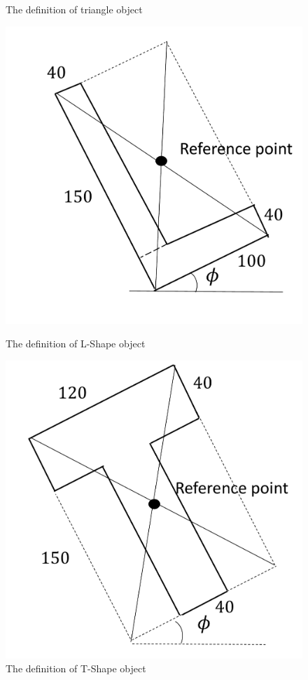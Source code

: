 \documentclass[a4paper,twoside,12pt,papersize, dvipdfmx]{iirthesis}
\begin{document}
\begin{figure}[b]
\begin{minipage}{0.49\hsize}
\caption{The definition of triangle object}\label{fig::planner::tridef}
\end{minipage}\hfill
\begin{minipage}{0.49\hsize}
\centering
\includegraphics[width=0.9\hsize]{fig/3-new-planner/LShapeDef.pdf}
\caption{The definition of L-Shape object}\label{fig::planner::lshapedef}
\end{minipage}\hfill
\begin{minipage}{0.49\hsize}
\centering
\includegraphics[width=0.9\hsize]{fig/3-new-planner/TShapeDef.pdf}
\caption{The definition of T-Shape object}\label{fig::planner::tshapedef}
\end{minipage}
\end{figure}
\end{document}
